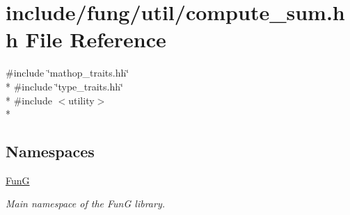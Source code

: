 \hypertarget{compute__sum_8hh}{}\section{include/fung/util/compute\+\_\+sum.hh File Reference}
\label{compute__sum_8hh}
{\ttfamily \#include \char`\"{}mathop\+\_\+traits.\+hh\char`\"{}}\\*
{\ttfamily \#include \char`\"{}type\+\_\+traits.\+hh\char`\"{}}\\*
{\ttfamily \#include $<$utility$>$}\\*
\subsection*{Namespaces}
\begin{DoxyCompactItemize}
\item 
 \hyperlink{namespaceFunG}{FunG}
\begin{DoxyCompactList}\small\item\em Main namespace of the FunG library. \end{DoxyCompactList}\end{DoxyCompactItemize}

